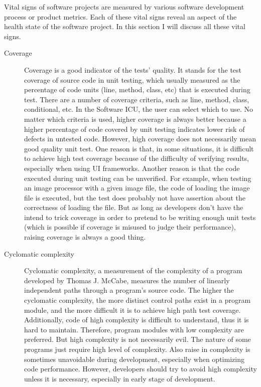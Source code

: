 Vital signs of software projects are measured by various software development process or product metrics. Each of these vital signs reveal an aspect of the health state of the software project. In this section I will discuss all these vital signs.
\begin{description}
\item[Coverage] 
Coverage is a good indicator of the tests' quality. It stands for the test coverage of source code in unit testing, which usually measured as the percentage of code units (line, method, class, etc) that is executed during test. There are a number of coverage criteria, such as line, method, class, conditional, etc. In the Software ICU, the user can select which to use. No matter which criteria is used, higher coverage is always better because a higher percentage of code covered by unit testing indicates lower risk of defects in untested code. However, high coverage does not necessarily mean good quality unit test. One reason is that, in some situations, it is difficult to achieve high test coverage because of the difficulty of verifying results, especially when using UI frameworks. Another reason is that the code executed during unit testing can be unverified. For example, when testing an image processor with a given image file, the code of loading the image file is executed, but the test does probably not have assertion about the correctness of loading the file. But as long as developers don't have the intend to trick coverage in order to pretend to be writing enough unit tests (which is possible if coverage is misused to judge their performance), raising coverage is always a good thing.

\item[Cyclomatic complexity] 
Cyclomatic complexity, a measurement of the complexity of a program developed by Thomas J. McCabe, measures the number of linearly independent paths through a program's source code\cite{mccabe:complexity}. The higher the cyclomatic complexity, the more distinct control paths exist in a program module, and the more difficult it is to achieve high path test coverage. Additionally, code of high complexity is difficult to understand, thus it is hard to maintain. Therefore, program modules  with low complexity are preferred. But high complexity is not necessarily evil. The nature of some programs just require high level of complexity. Also raise in complexity is sometimes unavoidable during development, especially when optimizing code performance. However, developers should try to avoid high complexity unless it is necessary, especially in early stage of development.


\end{description}
